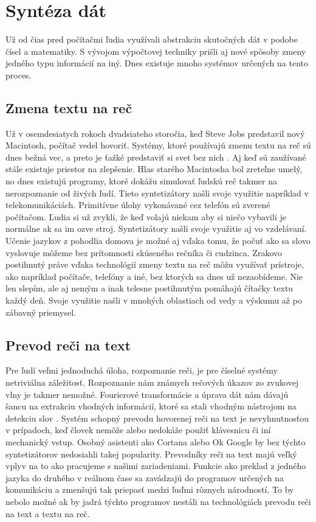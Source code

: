 
\chapter{Syntéza dát}
\label{synteza_dat}

Už od čias pred počítačmi ľudia využívali abstrakciu skutočných dát v podobe čísel a matematiky. S vývojom výpočtovej techniky prišli aj nové spôsoby zmeny jedného typu informácií na iný. Dnes existuje mnoho systémov určených na tento proces.

\section{Zmena textu na reč}
Už v osemdesiatych rokoch dvadsiateho storočia, keď Steve Jobs predstavil nový Macintosh, počítač vedel hovoriť.
Systémy, ktoré používajú zmenu textu na reč sú dnes bežná vec, a preto je ťažké predstaviť si svet bez nich \cite{text2speech}.
Aj keď sú zaužívané stále existuje priestor na zlepšenie. Hlas starého Macintosha bol zreteľne umelý, no dnes existujú programy, ktoré dokážu simulovať ľudskú reč takmer na nerozpoznanie od živých ľudí.
Tieto syntetizátory našli svoje využitie napríklad v telekomunikáciách.
Primitívne úlohy vykonávané cez telefón sú zverené počítačom.
Ľudia si už zvykli, že keď volajú niekam aby si niečo vybavili je normálne ak sa im ozve stroj.
Syntetizátory našli svoje využitie aj vo vzdelávaní.
Učenie jazykov z pohodlia domova je možné aj vďaka tomu, že počuť ako sa slovo vyslovuje môžeme bez prítomnosti skúseného rečníka či cudzinca.
Zrakovo postihnutý práve vďaka technológií zmeny textu na reč môžu využívať prístroje, ako napríklad počítače, telefóny a iné,  bez ktorých sa dnes už nezaobídeme.
Nie len slepím, ale aj nemým a inak telesne postihnutým pomáhajú čítačky textu každý deň. Svoje využitie našli v mnohých oblastiach od vedy a výskumu až po zábavný priemysel.

\section{Prevod reči na text}
Pre ľudí veľmi jednoduchá úloha, rozpoznanie reči, je pre číselné systémy netriviálna záležitosť.
Rozpoznanie nám známych rečových úkazov zo zvukovej vlny je takmer nemožné. Fourierové transformácie a úprava dát nám dávajú šancu na extrakciu vhodných informácií, ktoré sa stali vhodným nástrojom na detekciu slov \cite{speechRecognition}.
Systém schopný prevodu hovorenej reči na text je nevyhnutnosťou v prípadoch, keď človek nemôže alebo nedokáže použiť klávesnicu či iní mechanický vstup.
Osobný asistenti ako Cortana alebo Ok Google by bez týchto syntetizátorov nedosiahli takej popularity.
Prevodníky reči na text majú veľký vplyv na to ako pracujeme s našimi zariadeniami. Funkcie ako preklad z jedného jazyka do druhého v reálnom čase sa zavádzajú do programov určených na komunikáciu a zmenšujú tak priepasť medzi ľuďmi rôznych národností.
To by nebolo možné ak by jadrá týchto programov nestáli na technológiách prevodu reči na text a textu na reč.

